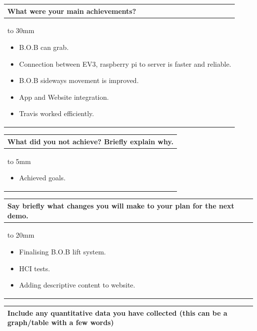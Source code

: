 \documentclass[a4paper]{article}
\newcommand{\colWidth}{141mm}
\begin{document}
\begin{center}
\begin{tabular}{|p{\colWidth}|}
	\hline
	\cellcolor{blue!25}\large
	\textbf{What were your main achievements?}
	\\ \hline
	\vtop to 30mm{
	\begin{itemize}
	    \item B.O.B can grab.
	    \item Connection between EV3, raspberry pi to server is faster and reliable.
	    \item B.O.B sideways movement is improved.
	    \item App and Website integration.
	    \item Travis worked efficiently.
	\end{itemize}
  }
  \\
  \hline
\end{tabular}
\vskip 5mm


\begin{tabular}{|p{\colWidth}|}
	\hline
	\cellcolor{blue!25}\large
	\textbf{What did you not achieve? Briefly explain why.}
	\\ \hline
	\vtop to 5mm{
	\begin{itemize}
	    \item Achieved goals.
	\end{itemize}
  }
  \\
  \hline
\end{tabular}
\vskip 5mm


\begin{tabular}{|p{\colWidth}|}
	\hline
	\cellcolor{blue!25}\large
	\textbf{Say briefly what changes you will make to your plan for the next demo.}
	\\ \hline
	\vtop to 20mm{
	\begin{itemize}
	    \item Finalising B.O.B lift system.
	    \item HCI tests.
	    \item Adding descriptive content to website. 
	\end{itemize}
  }
  \\
  \hline
\end{tabular}

\newpage
\begin{tabular}{|p{\colWidth}|}
	\hline
	\cellcolor{blue!25}\large
	\textbf{Include any quantitative data you have collected (this can be a graph/table with a few words)}
  \\
  \hline
\end{tabular}


\end{center}
\end{document}
